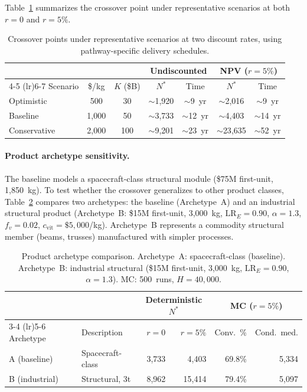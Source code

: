 \documentclass[preprint,12pt]{elsarticle}
\begin{document}
Table~\ref{tab:scenarios} summarizes the crossover point under representative scenarios at both $r = 0$ and $r = 5\%$.

\begin{table}[htbp]
\centering
\caption{Crossover points under representative scenarios at two discount rates, using pathway-specific delivery schedules.}
\label{tab:scenarios}
\small
\begin{tabular}{@{}lcccccc@{}}
\toprule
 & & & \multicolumn{2}{c}{Undiscounted} & \multicolumn{2}{c}{NPV ($r = 5\%$)} \\
\cmidrule(lr){4-5} \cmidrule(lr){6-7}
Scenario & \$/kg & $K$ (\$B) & $N^*$ & Time & $N^*$ & Time \\
\midrule
Optimistic   & 500     & 30  & $\sim$1{,}920 & $\sim$9~yr  & $\sim$2{,}016 & $\sim$9~yr \\
Baseline     & 1{,}000 & 50  & $\sim$3{,}733 & $\sim$12~yr & $\sim$4{,}403 & $\sim$14~yr \\
Conservative & 2{,}000 & 100 & $\sim$9{,}201 & $\sim$23~yr & $\sim$23{,}635 & $\sim$52~yr \\
\bottomrule
\end{tabular}
\end{table}

\paragraph{Product archetype sensitivity.} The baseline models a spacecraft-class structural module (\$75M first-unit, 1{,}850~kg). To test whether the crossover generalizes to other product classes, Table~\ref{tab:archetypes} compares two archetypes: the baseline (Archetype~A) and an industrial structural product (Archetype~B: \$15M first-unit, 3{,}000~kg, $\mathrm{LR}_E = 0.90$, $\alpha = 1.3$, $f_v = 0.02$, $c_{\mathrm{vit}} = \$5{,}000$/kg). Archetype~B represents a commodity structural member (beams, trusses) manufactured with simpler processes.

\begin{table}[htbp]
\centering
\caption{Product archetype comparison. Archetype~A: spacecraft-class (baseline). Archetype~B: industrial structural (\$15M first-unit, 3{,}000~kg, $\mathrm{LR}_E = 0.90$, $\alpha = 1.3$). MC: 500~runs, $H = 40{,}000$.}
\label{tab:archetypes}
\small
\begin{tabular}{@{}llrrrr@{}}
\toprule
 & & \multicolumn{2}{c}{Deterministic $N^*$} & \multicolumn{2}{c}{MC ($r = 5\%$)} \\
\cmidrule(lr){3-4} \cmidrule(lr){5-6}
Archetype & Description & $r = 0$ & $r = 5\%$ & Conv.\ \% & Cond.\ med. \\
\midrule
A (baseline)   & Spacecraft-class   & 3{,}733  & 4{,}403  & 69.8\%  & 5{,}334 \\
B (industrial) & Structural, 3t     & 8{,}962  & 15{,}414 & 79.4\%  & 5{,}097 \\
\bottomrule
\end{tabular}
\end{table}
\end{document}
